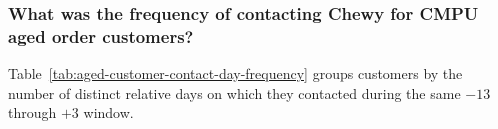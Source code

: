 \subsubsection{What was the frequency of contacting Chewy for CMPU aged order customers?}
Table~\ref{tab:aged-customer-contact-day-frequency} groups customers by the
number of distinct relative days on which they contacted during the same
$-13$ through $+3$ window.


